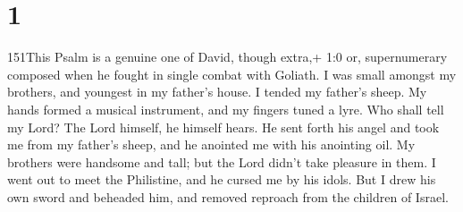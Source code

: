 \hypertarget{section}{%
\section{1}\label{section}}

151This Psalm is a genuine one of David, though extra,+ 1:0 or,
supernumerary composed when he fought in single combat with Goliath.
 I was small amongst my brothers, and youngest in my
father's house. I tended my father's sheep.  My hands formed
a musical instrument, and my fingers tuned a lyre.  Who
shall tell my Lord? The Lord himself, he himself hears.  He
sent forth his angel and took me from my father's sheep, and he anointed
me with his anointing oil.  My brothers were handsome and
tall; but the Lord didn't take pleasure in them.  I went out
to meet the Philistine, and he cursed me by his idols.  But
I drew his own sword and beheaded him, and removed reproach from the
children of Israel.
